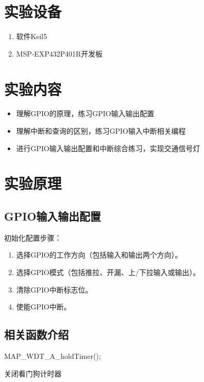 \documentclass[a4paper,10pt,UTF8]{paper}
\numberwithin{equation}{section}
\numberwithin{figure}{section}
\begin{document}
\section{实验设备}

\begin{enumerate}
  \item 软件Keil5
  \item MSP-EXP432P401R开发板

\end{enumerate}

\section{实验内容}

\begin{itemize}
  \item 理解GPIO的原理，练习GPIO输入输出配置
  \item 理解中断和查询的区别，练习GPIO输入中断相关编程
  \item 进行GPIO输入输出配置和中断综合练习，实现交通信号灯
\end{itemize}

\section{实验原理}

\subsection{GPIO输入输出配置}

初始化配置步骤：
\begin{enumerate}
  \item 选择GPIO的工作方向（包括输入和输出两个方向）。
  \item 选择GPIO模式（包括推拉、开漏、上/下拉输入或输出）。
  \item 清除GPIO中断标志位。
  \item 使能GPIO中断。
\end{enumerate}

\subsection{相关函数介绍}


\begin{ccode}
  MAP_WDT_A_holdTimer();
\end{ccode}

关闭看门狗计时器
\end{document}
